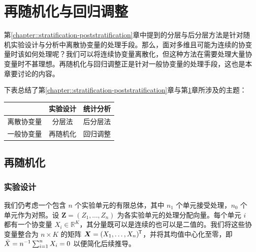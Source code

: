 
\chapter{再随机化与回归调整}
 \label{chapter:rerandomization-regression}


第\ref{chapter::stratification-poststratification}章中提到的分层与后分层方法是针对随机实验设计与分析中离散协变量的处理手段。那么，面对多维且可能为连续的协变量时该如何处理呢？我们可以将连续协变量离散化，但这种方法在需要处理大量协变量时不甚理想。再随机化与回归调整正是针对一般协变量的处理手段，这也是本章要讨论的内容。 


下表总结了第\ref{chapter::stratification-poststratification}章与第\ref{chapter:rerandomization-regression}章所涉及的主题：


\begin{center}
\begin{tabular}{c|c|c}
\hline 
 & 实验设计 & 统计分析 \\ 
 \hline 
 离散协变量 & 分层法 & 后分层法 \\
 \hline 
 一般协变量 & 再随机化 & 回归调整 \\
 \hline 
 \end{tabular}
\end{center}





\section{再随机化}

\subsection{实验设计}
我们仍考虑一个包含 $n$ 个实验单元的有限总体，其中 $n_1$ 个单元接受处理，$n_0$ 个单元作为对照。设 $\bm{Z} = (Z_1,\ldots, Z_n)$ 为各实验单元的处理分配向量。每个单元 $i$ 都有一个协变量 $X_i \in \mathbb{R}^K$，其分量既可以是连续的也可以是二值的。我们将这些协变量整合为 $n\times K$ 的矩阵 $\bm{X} = (X_1 , \ldots, X_n )  ^{\mkern-1.5mu\mathsf{T}}$，并将其均值中心化至零，即 $\bar{X}  = n^{-1} \sum_{i=1}^n X_i = 0$ 以便简化后续推导。 

